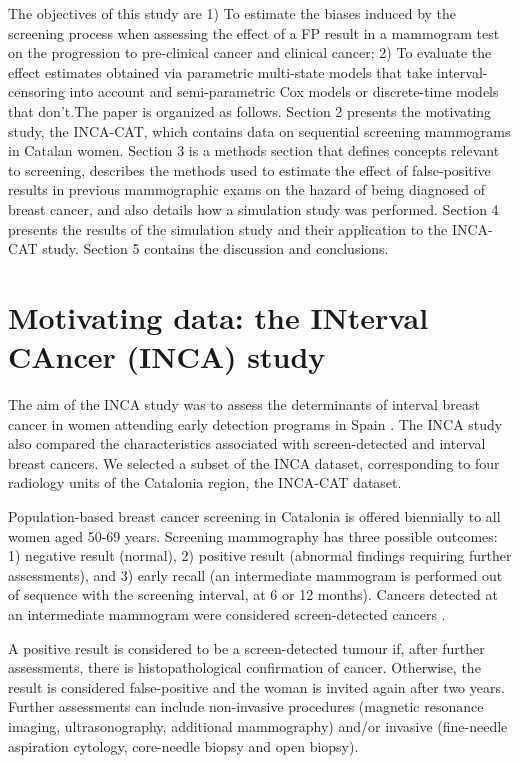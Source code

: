 \documentclass{bmcart}
\begin{document}
The objectives of this study are 1) To estimate the biases induced by the screening process when
assessing the effect of a FP result in a mammogram test on the progression to
pre-clinical cancer and clinical cancer; 2) To evaluate the effect estimates obtained via
parametric multi-state models that take interval-censoring into account and semi-parametric Cox
models or discrete-time models that don't.The paper is organized as follows. Section 2 presents the
motivating study, the INCA-CAT,  which contains data on sequential screening mammograms in Catalan
women. Section 3 is a methods section that defines concepts relevant to screening, describes the
methods used to estimate the effect of false-positive results in previous mammographic exams on the
hazard of being diagnosed of breast cancer, and also details how a simulation study was performed.
Section 4 presents the results of the simulation study and their application to the INCA-CAT study.
Section 5 contains the discussion and conclusions.

\section*{Motivating data: the INterval CAncer (INCA) study}
The aim of the INCA study was to assess the determinants of interval breast cancer in women
attending early detection programs in Spain \cite{Domingo2014, Blanch2014}. The INCA study also
compared the characteristics associated with screen-detected and interval breast cancers. We
selected a subset of the INCA dataset, corresponding to four radiology units of the Catalonia
region, the INCA-CAT dataset. 

Population-based breast cancer screening in Catalonia is offered biennially to all women aged 50-69
years. Screening mammography has three possible outcomes: 1) negative result (normal), 2) positive
result (abnormal findings requiring further assessments), and 3) early recall (an intermediate
mammogram is performed out of sequence with the screening interval, at 6 or 12 months). Cancers
detected at an intermediate mammogram were considered screen-detected cancers \cite{Perry2008}.

A positive result is considered to be a screen-detected tumour if, after further assessments, there
is histopathological confirmation of cancer. Otherwise, the result is considered false-positive and
the woman is invited again after two years. Further assessments can include non-invasive procedures
(magnetic resonance imaging, ultrasonography, additional mammography) and/or invasive (fine-needle
aspiration cytology, core-needle biopsy and open biopsy).
\end{document}
